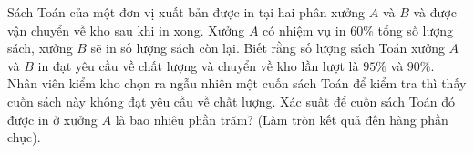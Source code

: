 \renewcommand{\baselinestretch}{1.5}
\begin{ex}%
	Sách Toán của một đơn vị xuất bản được in tại hai phân xưởng $A$ và $B$ và được vận chuyển về kho sau khi in xong. Xưởng $A$ có nhiệm vụ in $60\%$ tổng số lượng sách, xưởng $B$ sẽ in số lượng sách còn lại. Biết rằng số lượng sách Toán xưởng $A$ và $B$ in đạt yêu cầu về chất lượng và chuyển về kho lần lượt là $95\%$ và $90\%$. Nhân viên kiểm kho chọn ra ngẫu nhiên một cuốn sách Toán để kiểm tra thì thấy cuốn sách này không đạt yêu cầu về chất lượng. Xác suất để cuốn sách Toán đó được in ở xưởng $A$ là bao nhiêu phần trăm? (Làm tròn kết quả đến hàng phần chục).
	
\end{ex}
